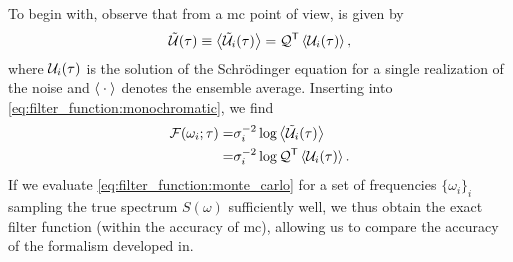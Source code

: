 To begin with, observe that from a \gls{mc} point of view, \liouvUe is given by
\begin{align}
    \liouvUe(\tau) \equiv \expval{\liouvUe_i(\tau)} = \liouvQ\transpose \expval{\liouvU_i(\tau)},
\end{align}
where $\mathcal{U}_i(\tau)$ is the solution of the Schrödinger equation for a single realization of the noise and $\expval{\:\cdot\:}$ denotes the ensemble average.
Inserting into \cref{eq:filter_function:monochromatic}, we find
\begin{equation}
    \label{eq:filter_function:monte_carlo}
    \begin{split}
        \mc{F}(\omega_i; \tau) =& \sigma_i^{-2}\log\expval{\liouvUe_i(\tau)} \\
                               =& \sigma_i^{-2}\log\liouvQ\transpose\expval{\liouvU_i(\tau)}.
    \end{split}
\end{equation}
If we evaluate \cref{eq:filter_function:monte_carlo} for a set of frequencies $\lbrace\omega_i\rbrace_i$ sampling the true spectrum $S(\omega)$ sufficiently well, we thus obtain the exact filter function \FF (within the accuracy of \gls{mc}), allowing us to compare the accuracy of the formalism developed in.

